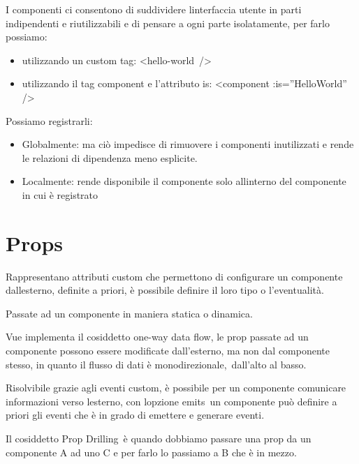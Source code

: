 \documentclass[
]{article}
\providecommand{\tightlist}{%
  \setlength{\itemsep}{0pt}\setlength{\parskip}{0pt}}
\begin{document}
{I componenti ci consentono di suddividere l\textquotesingle interfaccia
utente in parti indipendenti e riutilizzabili e di pensare a ogni parte
isolatamente, per farlo possiamo:}

\begin{itemize}
\tightlist
\item
  {utilizzando un custom tag: }{\textless hello-world}{~/\textgreater{}}
\item
  {utilizzando il tag component e l'attributo is: }{\textless component
  :is=''HelloWorld'' /\textgreater{}}
\end{itemize}

{}

{Possiamo registrarli:}

\begin{itemize}
\tightlist
\item
  {Globalmente}{: ma ciò impedisce di rimuovere i componenti
  inutilizzati e rende le relazioni di dipendenza meno esplicite.}
\item
  {Localmente}{: rende disponibile il componente solo
  all\textquotesingle interno del componente in cui è registrato }
\end{itemize}

\section{\texorpdfstring{{Props}}{Props}}\label{h.5livhfyz3iqt}

{Rappresentano attributi custom che permettono di configurare un
componente dall\textquotesingle esterno, definite a priori, è possibile
definire il loro tipo o l'eventualità.}

{}

{Passate ad un componente in maniera statica o dinamica.}

{}

{Vue implementa il cosiddetto }{one-way data flow}{, le prop passate ad
un componente possono essere modificate dall'esterno, ma non dal
componente stesso, in quanto il flusso di dati è
}{monodirezionale,}{~dall'alto al basso.}

{Risolvibile grazie agli eventi custom, è possibile per un componente
comunicare informazioni verso l\textquotesingle esterno, con
l\textquotesingle opzione }{emits}{~un componente può definire a priori
gli eventi che è in grado di emettere e generare eventi.}

{}

{Il cosiddetto }{Prop Drilling}{~è quando dobbiamo passare una prop da
un componente A ad uno C e per farlo lo passiamo a B che è in mezzo.}
\end{document}
